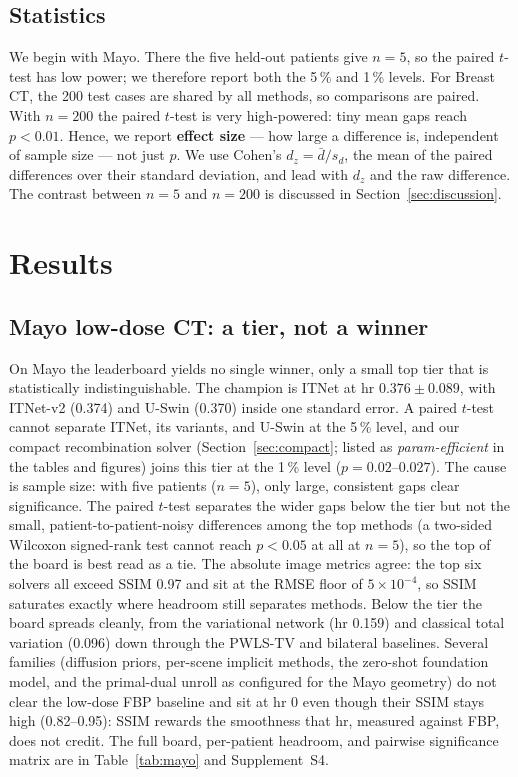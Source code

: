 \documentclass[AMA,twocolumn]{USG} %
\begin{document}
\subsection{Statistics}\label{sec:stats}

We begin with Mayo. There the five held-out patients give $n=5$, so the paired $t$-test has low power; we therefore report both the 5\,\% and 1\,\% levels. For Breast CT, the 200 test cases are shared by all methods, so comparisons are paired. With $n=200$ the paired $t$-test is very high-powered: tiny mean gaps reach $p<0.01$. Hence, we report \textbf{effect size} --- how large a difference is, independent of sample size --- not just $p$. We use Cohen's $d_z=\bar d/s_d$, the mean of the paired differences over their standard deviation, and lead with $d_z$ and the raw difference. The contrast between $n=5$ and $n=200$ is discussed in Section~\ref{sec:discussion}.

\section{Results}\label{sec:results}

\subsection{Mayo low-dose CT: a tier, not a winner}\label{sec:tier}

On Mayo the leaderboard yields no single winner, only a small top tier that is statistically indistinguishable. The champion is ITNet at hr $0.376\pm0.089$, with ITNet-v2 (0.374) and U-Swin (0.370) inside one standard error. A paired $t$-test cannot separate ITNet, its variants, and U-Swin at the 5\,\% level, and our compact recombination solver (Section~\ref{sec:compact}; listed as \emph{param-efficient} in the tables and figures) joins this tier at the 1\,\% level ($p=0.02$--$0.027$). The cause is sample size: with five patients ($n=5$), only large, consistent gaps clear significance. The paired $t$-test separates the wider gaps below the tier but not the small, patient-to-patient-noisy differences among the top methods (a two-sided Wilcoxon signed-rank test cannot reach $p<0.05$ at all at $n=5$), so the top of the board is best read as a tie. The absolute image metrics agree: the top six solvers all exceed SSIM 0.97 and sit at the RMSE floor of $5\times10^{-4}$, so SSIM saturates exactly where headroom still separates methods. Below the tier the board spreads cleanly, from the variational network (hr 0.159) and classical total variation (0.096) down through the PWLS-TV and bilateral baselines. Several families (diffusion priors, per-scene implicit methods, the zero-shot foundation model, and the primal-dual unroll as configured for the Mayo geometry) do not clear the low-dose FBP baseline and sit at hr 0 even though their SSIM stays high (0.82--0.95): SSIM rewards the smoothness that hr, measured against FBP, does not credit. The full board, per-patient headroom, and pairwise significance matrix are in Table~\ref{tab:mayo} and Supplement~S4.
\end{document}
